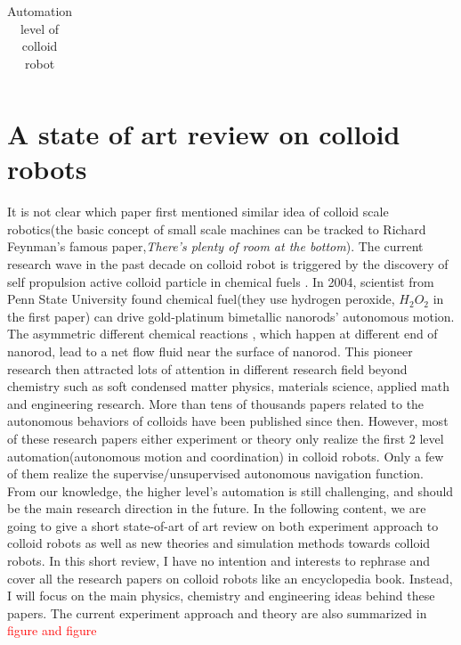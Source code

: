 \begin{table}[h!]
\begin{tabular}{ | m{6cm} | m{6cm} | }
    
    
  \end{tabular}
  \caption{Automation level of colloid robot}\label{tbl:myLboro}
\end{table}



\section{A state of art review on colloid robots }
It is not clear which paper first mentioned  similar idea of colloid scale robotics(the basic concept of  small scale machines can be tracked to Richard Feynman's famous paper,\textit{There's plenty of room at the bottom}\cite{feynman1960there}). The current research wave in the past decade on colloid robot is triggered by the discovery of self propulsion active colloid particle in chemical fuels \cite{paxton2004catalytic}. In 2004, scientist from Penn State University found chemical fuel(they use hydrogen peroxide, $H_2O_2$ in the first paper) can drive  gold-platinum bimetallic nanorods' autonomous motion. The asymmetric different chemical reactions , which happen at different end of nanorod,  lead to a net flow fluid near the surface of nanorod. This pioneer research then attracted lots of attention in different research field beyond chemistry such as soft condensed matter physics\cite{Marchetti2013}, materials science\cite{han2018engineering}, applied math\cite{fodor2016far} and engineering research\cite{sitti2015biomedical}. More than tens of thousands papers related to the autonomous behaviors of colloids have been published since then. However, most of these research papers either experiment or theory only realize the first 2 level automation(autonomous motion and coordination) in colloid robots. Only a few of them realize the supervise/unsupervised autonomous navigation function. From our knowledge, the higher level's automation is still challenging, and should be the main research direction in the future. In the following content, we are going to give a short state-of-art of art review on both experiment approach to colloid robots as well as new theories and simulation methods towards colloid robots. In this short review, I have no intention and interests to rephrase and cover all the research papers on colloid robots like an encyclopedia book. Instead,  I will focus on the main physics, chemistry and engineering ideas behind these papers. The current experiment approach and theory are also summarized in \textcolor{red}{figure and figure}  

